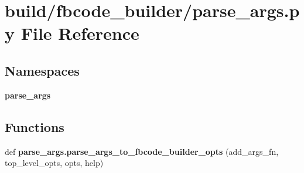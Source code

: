 \section{build/fbcode\+\_\+builder/parse\+\_\+args.py File Reference}
\label{parse__args_8py}
\subsection*{Namespaces}
\begin{DoxyCompactItemize}
\item 
 {\bf parse\+\_\+args}
\end{DoxyCompactItemize}
\subsection*{Functions}
\begin{DoxyCompactItemize}
\item 
def {\bf parse\+\_\+args.\+parse\+\_\+args\+\_\+to\+\_\+fbcode\+\_\+builder\+\_\+opts} (add\+\_\+args\+\_\+fn, top\+\_\+level\+\_\+opts, opts, help)
\end{DoxyCompactItemize}
